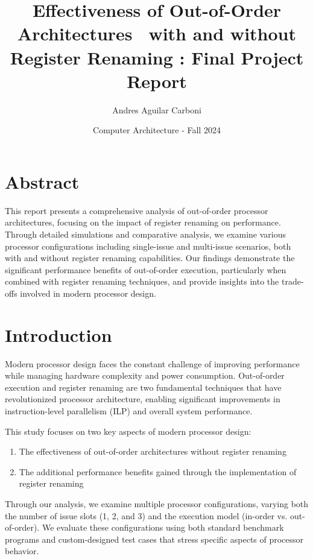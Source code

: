 \documentclass{article}
\title{Effectiveness of Out-of-Order Architectures \ with and without Register Renaming : Final Project Report}
\author{Andres Aguilar Carboni}
\date{Computer Architecture - Fall 2024}
\begin{document}
\maketitle
\maketitle

\section*{Abstract}
This report presents a comprehensive analysis of out-of-order processor architectures, focusing on the impact of register renaming on performance. Through detailed simulations and comparative analysis, we examine various processor configurations including single-issue and multi-issue scenarios, both with and without register renaming capabilities. Our findings demonstrate the significant performance benefits of out-of-order execution, particularly when combined with register renaming techniques, and provide insights into the trade-offs involved in modern processor design.

\section{Introduction}
Modern processor design faces the constant challenge of improving performance while managing hardware complexity and power consumption. Out-of-order execution and register renaming are two fundamental techniques that have revolutionized processor architecture, enabling significant improvements in instruction-level parallelism (ILP) and overall system performance.

This study focuses on two key aspects of modern processor design:
\begin{enumerate}
    \item The effectiveness of out-of-order architectures without register renaming
    \item The additional performance benefits gained through the implementation of register renaming
\end{enumerate}

Through our analysis, we examine multiple processor configurations, varying both the number of issue slots (1, 2, and 3) and the execution model (in-order vs. out-of-order). We evaluate these configurations using both standard benchmark programs and custom-designed test cases that stress specific aspects of processor behavior.
\end{document}
